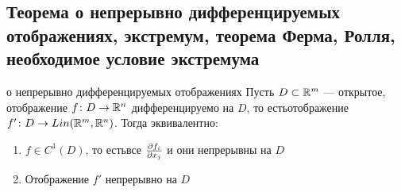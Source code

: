\subsection{Теорема о непрерывно дифференцируемых отображениях, экстремум, теорема Ферма, Ролля, необходимое условие экстремума}

\begin{teor}[https://www.youtube.com/live/4MoAp-Ts_Ig?si=_DYzvkvgcIWNzWfG&t=10988]{о непрерывно дифференцируемых отображениях}
	Пусть $D\subset \mathbb R^m$ --- открытое, отображение $f \colon D \to \mathbb R^n$ дифференцируемо на $D$, то есть\E отображение $f'\colon D \to Lin(\mathbb R^m, \mathbb R^n)$. Тогда эквивалентно:
	\begin{enumerate}
		\item $f \in C^1(D)$, то есть\E все $\frac{\partial f_i}{\partial x_j}$ и они непрерывны на $D$ 
		
		\item Отображение $f'$ непрерывно на $D$
	\end{enumerate}
\end{teor}

